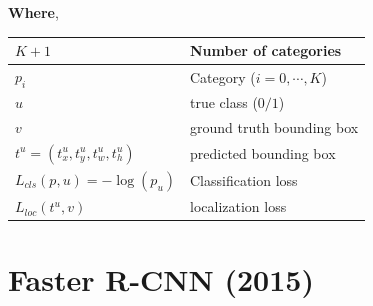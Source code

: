 \noindent \textbf{Where},
\begin{customTableWrapper}{1.3}
\begin{table}[h]
    \begin{tabular}{l l}
        $K+1$ & Number of categories \\ \hline

        $p_i$ & Category ($i=0,\cdots,K$) \\
        $u$ & true class ($0/1$) \\ \hline

        $v$ & ground truth bounding box \\
        $t^u = (t^u_x,t^u_y,t^u_w,t^u_h)$ & predicted bounding box \\ \hline

        $L_{cls}(p,u) = -\log(p_u)$ & Classification loss \\
        $L_{loc}(t^u,v)$ & localization loss \\
    \end{tabular}
\end{table}
\end{customTableWrapper}










\section{Faster R-CNN (2015) \cite{arxiv/1506.01497-faster-rcnn,gfg/faster-r-cnn-ml}}\label{Faster R-CNN}

